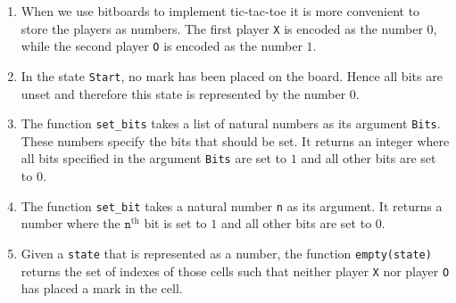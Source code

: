 \begin{enumerate}
\item When we use bitboards to implement tic-tac-toe it is more convenient to store the players as numbers. The
      first player \texttt{X} is encoded as the number $0$, while the second player \texttt{O} is encoded as
      the number $1$. 
\item In the state \texttt{Start}, no mark has been placed on the board.  Hence all bits are unset and therefore this
      state is represented by the number $0$. 
\item The function \texttt{set\_bits} takes a list of natural numbers as its argument \texttt{Bits}.  These numbers specify
      the bits that should be set.  It returns an integer where all bits specified in the argument
      \texttt{Bits} are set to $1$ and all other bits are set to $0$.
\item The function \texttt{set\_bit} takes a natural number \texttt{n} as its argument.  It returns a number
      where the $\texttt{n}^\mathrm{th}$ bit is set to $1$ and all other bits are set to $0$.
\item Given a \texttt{state} that is represented as a number, the function \texttt{empty(state)} returns the
      set of indexes of those cells such that neither player \texttt{X} nor player \texttt{O} has placed a mark
      in the cell.


\end{enumerate}

